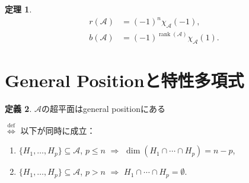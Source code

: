 \documentclass[xelatex,ja=standard,a4paper,14pt,everyparhook=compat]{bxjsarticle}
\newcommand{\mcA}{\mathcal{A}}
\DeclareMathOperator{\rank}{rank}
\theoremstyle{definition}
\newtheorem{theorem}{定理}
\newtheorem{definition}[theorem]{定義}
\begin{document}
\begin{theorem}
    \begin{align*}
        r(\mcA) & = (-1)^n \chi_\mcA(-1),            \\
        b(\mcA) & = (-1)^{\rank(\mcA)} \chi_\mcA(1).
    \end{align*}
\end{theorem}

\section{General Positionと特性多項式}

\begin{definition}
    $\mcA$の超平面はgeneral positionにある

    $\overset{\mathrm{def}}{\iff}$ 以下が同時に成立： \begin{enumerate}
        \item $\{H_1,\ldots,H_p\} \subseteq \mcA$, $p \leq n$ $\Longrightarrow$ $\dim(H_1 \cap \cdots \cap H_p) = n-p$,
        \item $\{H_1,\ldots,H_p\} \subseteq \mcA$, $p > n$ $\Longrightarrow$ $H_1 \cap \cdots \cap H_p = \emptyset$.
    \end{enumerate}
\end{definition}
\end{document}
